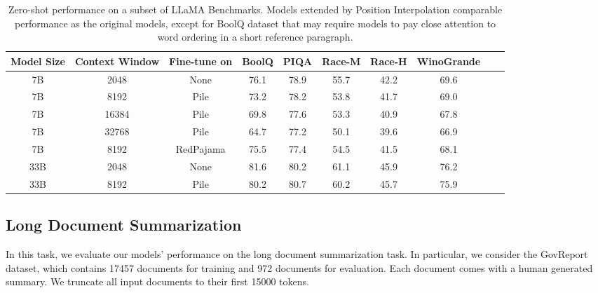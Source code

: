 \documentclass{article} %
\theoremstyle{definition}
\newcommand{\ignore}[1]{}
\begin{document}
\ignore{
This is encouraging since the results suggest the models still preserve relatively well their ability
in their original context window sizes even they are fine-tuned on much larger context windows.
This also suggests that the fact that Position
Interpolation puts position encodings into a much narrower region seem does not hurt
the modeling quality significantly.
}

\begin{table}[]
    \centering
    \begin{tabular}{cccccccccc}
       \toprule
       Model Size & Context Window & Fine-tune on & BoolQ & PIQA & Race-M & Race-H & WinoGrande \\
       \midrule
       7B & 2048 & None & 76.1 & 78.9 & 55.7 & 42.2 & 69.6 \\
       \midrule
       7B & 8192 & Pile & 73.2 & 78.2 & 53.8 & 41.7 & 69.0 \\
       7B & 16384 & Pile & 69.8   & 77.6 & 53.3 & 40.9  & 67.8 \\
       7B & 32768 & Pile & 64.7   & 77.2 & 50.1 & 39.6  & 66.9 \\
       7B & 8192 & RedPajama & 75.5 & 77.4 & 54.5 & 41.5 & 68.1 \\
       \midrule
       33B & 2048 & None & 81.6   & 80.2 & 61.1 & 45.9 & 76.2 \\
       \midrule
       33B & 8192 & Pile & 80.2   & 80.7 & 60.2 & 45.7 & 75.9 \\       
       \bottomrule
    \end{tabular}
    \caption{\small Zero-shot performance on a subset of LLaMA Benchmarks. Models extended by Position Interpolation comparable performance as the original models, except for BoolQ dataset that may require models to pay close attention to word ordering in a short reference paragraph.}
    \label{tab:llama_original}
\end{table}


\subsection{Long Document Summarization}

In this task, we evaluate our models' performance on the long document summarization task. 
In particular, we consider the GovReport \citep{huang-etal-2021-efficient} dataset, which contains 17457 documents for training and 972 documents for evaluation.
Each document comes with a human generated summary.
We truncate all input documents to their first 15000 tokens.
\end{document}
